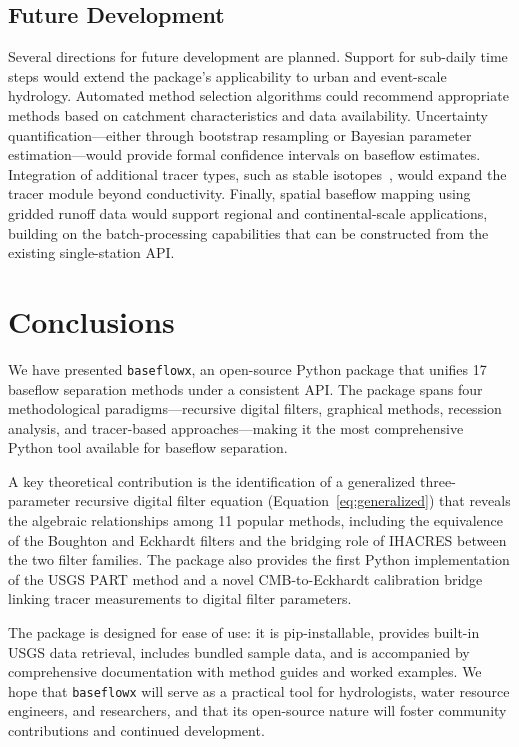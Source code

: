 \documentclass[hydrology,article,submit,pdftex,moreauthors]{Definitions/mdpi}
\begin{document}
\subsection{Future Development}
\label{sec:future}

Several directions for future development are planned. Support for sub-daily time steps would extend the package's applicability to urban and event-scale hydrology. Automated method selection algorithms could recommend appropriate methods based on catchment characteristics and data availability. Uncertainty quantification---either through bootstrap resampling or Bayesian parameter estimation---would provide formal confidence intervals on baseflow estimates. Integration of additional tracer types, such as stable isotopes~\cite{Klaus2013}, would expand the tracer module beyond conductivity. Finally, spatial baseflow mapping using gridded runoff data would support regional and continental-scale applications, building on the batch-processing capabilities that can be constructed from the existing single-station API.

\section{Conclusions}
\label{sec:conclusions}

We have presented \texttt{baseflowx}, an open-source Python package that unifies 17 baseflow separation methods under a consistent API. The package spans four methodological paradigms---recursive digital filters, graphical methods, recession analysis, and tracer-based approaches---making it the most comprehensive Python tool available for baseflow separation.

A key theoretical contribution is the identification of a generalized three-parameter recursive digital filter equation (Equation~\ref{eq:generalized}) that reveals the algebraic relationships among 11 popular methods, including the equivalence of the Boughton and Eckhardt filters and the bridging role of IHACRES between the two filter families. The package also provides the first Python implementation of the USGS PART method and a novel CMB-to-Eckhardt calibration bridge linking tracer measurements to digital filter parameters.

The package is designed for ease of use: it is pip-installable, provides built-in USGS data retrieval, includes bundled sample data, and is accompanied by comprehensive documentation with method guides and worked examples. We hope that \texttt{baseflowx} will serve as a practical tool for hydrologists, water resource engineers, and researchers, and that its open-source nature will foster community contributions and continued development.
\end{document}
